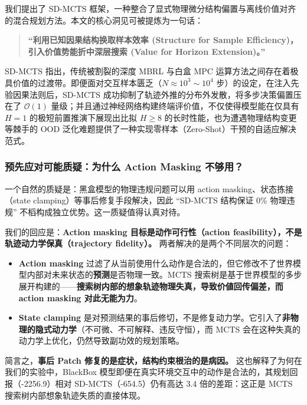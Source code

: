 \documentclass[UTF8]{ctexart}
\providecommand{\tightlist}{%
  \setlength{\itemsep}{0pt}\setlength{\parskip}{0pt}}
\begin{document}
我们提出了 SD-MCTS
框架，一种整合了显式物理微分结构偏置与离线价值对齐的混合规划方法。本文的核心洞见可被提炼为一句话：

\begin{quote}
\textbf{``利用已知因果结构换取样本效率 (Structure for Sample
Efficiency)，引入价值势能折中深层搜索 (Value for Horizon Extension)。''}
\end{quote}

SD-MCTS 指出，传统被割裂的深度 MBRL 与白盒 MPC
运算方法之间存在着极具价值的过渡带。即便面对交互样本匮乏（\(N \approx 10^3 \sim 10^4\)
步）的设定，在注入先验因果法则后，SD-MCTS
成功抑制了轨迹外推的分布外发散，将多步决策偏置压在了 \(\mathcal{O}(1)\)
量级；并且通过神经网络构建终端评价值，不仅使得模型能在仅具有 \(H=1\)
的极短前置推演下展现出比拟 \(H \ge 8\)
的长时性能，也为遭遇物理结构变更等棘手的 OOD
泛化难题提供了一种实现零样本（Zero-Shot）干预的自适应解决范式。

\hypertarget{ux9884ux5148ux5e94ux5bf9ux53efux80fdux8d28ux7591ux4e3aux4ec0ux4e48-action-masking-ux4e0dux591fux7528}{%
\subsubsection{预先应对可能质疑：为什么 Action Masking
不够用？}\label{ux9884ux5148ux5e94ux5bf9ux53efux80fdux8d28ux7591ux4e3aux4ec0ux4e48-action-masking-ux4e0dux591fux7528}}

一个自然的质疑是：黑盒模型的物理违规问题可以用 action
masking、状态拣接（state clamping）等事后修复手段解决，因此 ``SD-MCTS
结构保证 0\% 物理违规'' 不槄构成独立优势。这一质疑值得认真对待。

我们的回应是：\textbf{Action masking 目标是动作可行性（action
feasibility），不是轨迹动力学保真（trajectory fidelity）。}
两者解决的是两个不同层次的问题：

\begin{itemize}
\tightlist
\item
  \textbf{Action masking}
  过滤了从当前使用什么动作是合法的，但它修改不了世界模型内部对未来状态的\textbf{预测}是否物理一致。MCTS
  搜索树是基于世界模型的多步展开构建的------\textbf{搜索树内部的想象轨迹物理失真，导致价値回传偏差，而
  action masking 对此无能为力}。
\item
  \textbf{State clamping}
  是对预测结果的事后修切，不是修复动力学。它引入了\textbf{非物理的隐式动力学}（不可微、不可解释、违反守恒），而
  MCTS 会在这种失真的动力学上优化，仍然导致副功效的规划策略。
\end{itemize}

简言之，\textbf{事后 Patch 修复的是症状，结构约束根治的是病因。}
这也解释了为何在我们的实验中，BlackBox
模型即便在真实环境交互中的动作是合法的，其规划回报（-2256.9）相对
SD-MCTS（-654.5）仍有高达 3.4 倍的差距：这正是 MCTS
搜索树内部想象轨迹失质的直接体现。
\end{document}
